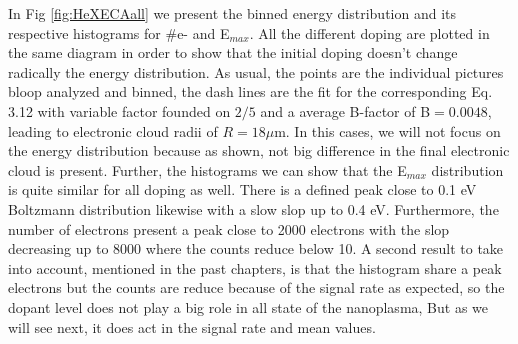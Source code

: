 In Fig \ref{fig:HeXECAall} we present the binned energy distribution and its respective histograms for $\#$e- and E$_{max}$. All the different doping are plotted in the same diagram in order to show that the initial doping doesn't change radically the energy distribution. As usual, the points are the individual pictures bloop analyzed and binned, the dash lines are the fit for the corresponding Eq. 3.12 with variable factor founded on $2/5$ and a average B-factor of B$=0.0048$, leading to electronic cloud radii of $R=18 \mu$m. In this cases, we will not focus on the energy distribution because as shown, not big difference in the final electronic cloud is present. Further, the histograms we can show that the E$_{max}$ distribution is quite similar for all doping as well.  There is a defined peak close to 0.1 eV Boltzmann distribution likewise with a slow slop up to 0.4 eV. Furthermore, the number of electrons present a peak close to 2000 electrons with the slop decreasing up to 8000 where the counts reduce below 10. A second result to take into account, mentioned in the past chapters, is that the histogram share a peak electrons but the counts are reduce because of the signal rate as expected, so the dopant level does not play a big role in all state of the nanoplasma, But as we will see next, it does act in the signal rate and mean values.


